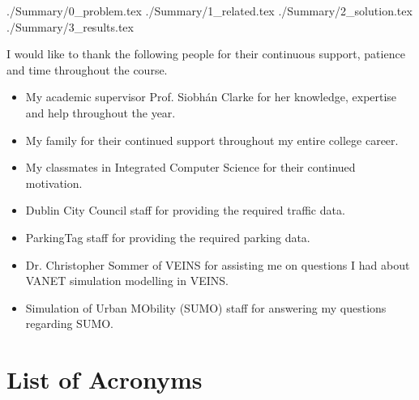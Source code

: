 \documentclass[a4paper, 11pt, oneside]{report}
\begin{document}
\thesistitlepage
\thesisdeclarationpage

\begin{thesissummary}
{./Summary/0_problem.tex}
{./Summary/1_related.tex}
{./Summary/2_solution.tex}
{./Summary/3_results.tex}
\end{thesissummary}

\begin{thesisabstract}
\end{thesisabstract}

\begin{thesisacknowledgments}
I would like to thank the following people for their continuous support, patience and time throughout the course.
\begin{itemize}
    \setlength\itemsep{0em}
    \item My academic supervisor Prof. Siobhán Clarke for her knowledge, expertise and help throughout the year.
    \item My family for their continued support throughout my entire college career.
    \item My classmates in Integrated Computer Science for their continued motivation.
    \item Dublin City Council staff for providing the required traffic data.
    \item ParkingTag staff for providing the required parking data.
    \item Dr. Christopher Sommer of VEINS for assisting me on questions I had about \ac{VANET} simulation modelling in VEINS.
    \item Simulation of Urban MObility (SUMO) staff for answering my questions regarding SUMO.
\end{itemize}
\end{thesisacknowledgments}

\pagebreak

\tableofcontents                                  %
\listoftables                                     %
\listoffigures                                    %

\pagebreak

\chapter*{List of Acronyms}
\begin{acronym}
\end{acronym}
\end{document}
